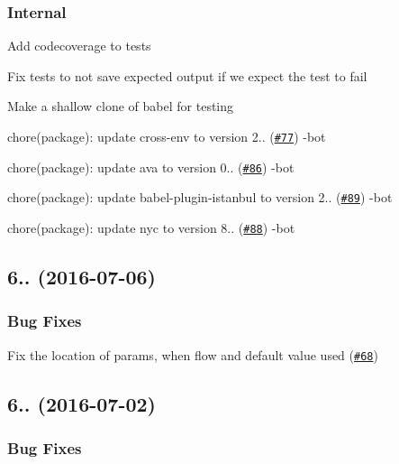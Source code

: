 \subsubsection*{Internal}


\begin{DoxyItemize}
\item Add codecoverage to tests 
\item Fix tests to not save expected output if we expect the test to fail 
\item Make a shallow clone of babel for testing 
\item chore(package)\+: update cross-\/env to version 2.. (\href{https://github.com/babel/babylon/pull/77}{\tt \#77}) -\/bot
\item chore(package)\+: update ava to version 0.. (\href{https://github.com/babel/babylon/pull/86}{\tt \#86}) -\/bot
\item chore(package)\+: update babel-\/plugin-\/istanbul to version 2.. (\href{https://github.com/babel/babylon/pull/89}{\tt \#89}) -\/bot
\item chore(package)\+: update nyc to version 8.. (\href{https://github.com/babel/babylon/pull/88}{\tt \#88}) -\/bot
\end{DoxyItemize}

\subsection*{6.. (2016-\/07-\/06)}

\subsubsection*{Bug Fixes}


\begin{DoxyItemize}
\item Fix the location of params, when flow and default value used (\href{https://github.com/babel/babylon/pull/68}{\tt \#68}) 
\end{DoxyItemize}

\subsection*{6.. (2016-\/07-\/02)}

\subsubsection*{Bug Fixes}


